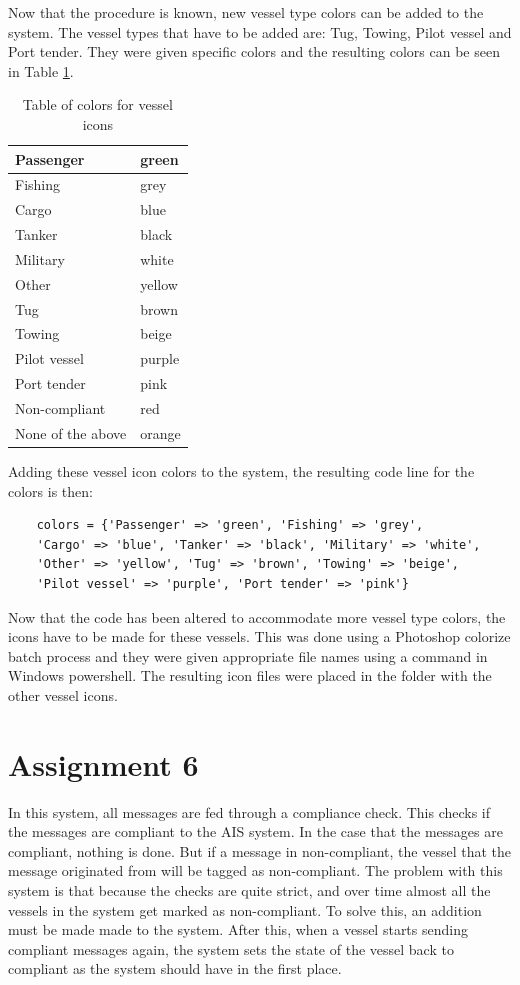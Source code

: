\documentclass[12pt]{article}
\begin{document}
Now that the procedure is known, new vessel type colors can be added to the system. The vessel types that have to be added are: Tug, Towing, Pilot vessel and Port tender. They were given specific colors and the resulting colors can be seen in Table \ref{colortable}.
\begin{table}
\centering

\begin{tabular}{|l|l|}
	\hline
	Passenger & green \\
	\hline
	Fishing & grey \\
	\hline
	Cargo & blue \\
	\hline
	Tanker & black \\
	\hline
	Military & white \\
	\hline
	Other & yellow \\
	\hline
	Tug & brown \\
	\hline
	Towing & beige \\
	\hline
	Pilot vessel & purple \\
	\hline
	Port tender & pink \\
	\hline
	Non-compliant & red \\
	\hline
	None of the above & orange \\
	\hline
\end{tabular}
\caption{Table of colors for vessel icons}
\label{colortable}
\end{table}

Adding these vessel icon colors to the system, the resulting code line for the colors is then:
\begin{verbatim}
    colors = {'Passenger' => 'green', 'Fishing' => 'grey', 
    'Cargo' => 'blue', 'Tanker' => 'black', 'Military' => 'white', 
    'Other' => 'yellow', 'Tug' => 'brown', 'Towing' => 'beige', 
    'Pilot vessel' => 'purple', 'Port tender' => 'pink'}
\end{verbatim}

Now that the code has been altered to accommodate more vessel type colors, the icons have to be made for these vessels. This was done using a Photoshop colorize batch process and they were given appropriate file names using a command in Windows powershell. The resulting icon files were placed in the folder with the other vessel icons.


\section*{Assignment 6}
In this system, all messages are fed through a compliance check. This checks if the messages are compliant to the AIS system. In the case that the messages are compliant, nothing is done. But if a message in non-compliant, the vessel that the message originated from will be tagged as non-compliant. The problem with this system is that because the checks are quite strict, and over time almost all the vessels in the system get marked as non-compliant. To solve this, an addition must be made made to the system. After this, when a vessel starts sending compliant messages again, the system sets the state of the vessel back to compliant as the system should have in the first place.
\end{document}
